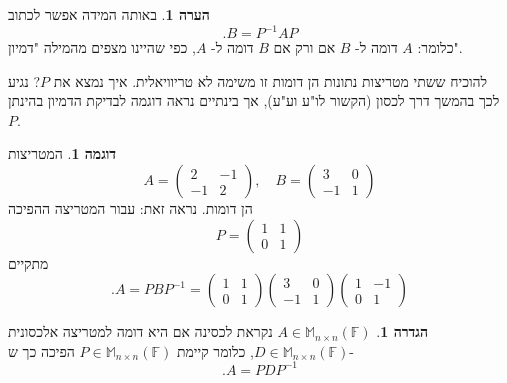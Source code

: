 \documentclass[12pt]{report}
\theoremstyle{plain}
\theoremstyle{definition}
\newtheorem{definition}[theorem]{הגדרה}
\newtheorem{example}{דוגמה}[chapter]
\newtheorem{remark}{הערה}[chapter]
\newcommand{\F}{\mathbb{F}}
\newcommand{\M}{\mathbb{M}}
\newcommand{\0}{\mathbf{0}}
\begin{document}
\begin{remark}
באותה המידה אפשר לכתוב
$$
.B=P^{-1}AP
$$
כלומר: 
$A$
דומה ל-
$B$
אם ורק אם
$B$
דומה ל-
$A$, 
כפי שהיינו מצפים מהמילה "דמיון".

להוכיח ששתי מטריצות נתונות הן דומות זו משימה לא טריוויאלית. איך נמצא את
$P$?
נגיע לכך בהמשך דרך לכסון (הקשור לו"ע וע"ע), אך בינתיים נראה דוגמה לבדיקת הדמיון בהינתן
$P$.
\end{remark}

\begin{example}\label{ex:similar}
המטריצות 
$$
A=\begin{pmatrix}
2 & -1 \\
-1 & 2
\end{pmatrix},\quad B=\begin{pmatrix}
3 & 0 \\
-1 & 1
\end{pmatrix}
$$
הן דומות. נראה זאת: עבור המטריצה ההפיכה
$$
P=\begin{pmatrix}
1 & 1 \\
0 & 1
\end{pmatrix}
$$
מתקיים
$$
.A=PBP^{-1}=\begin{pmatrix}
1 & 1 \\
0 & 1
\end{pmatrix}\begin{pmatrix}
3 & 0 \\
-1 & 1
\end{pmatrix}\begin{pmatrix}
1 & -1 \\
0 & 1
\end{pmatrix}
$$
\end{example}

\begin{definition}
$A\in\M_{n\times n}(\F)$
נקראת לכסינה אם היא דומה למטריצה אלכסונית
$D\in\M_{n\times n}(\F)$,
כלומר קיימת 
$P\in\M_{n\times n}(\F)$
הפיכה כך ש-
$$
.A=PDP^{-1}
$$ 
\end{definition}
\end{document}

